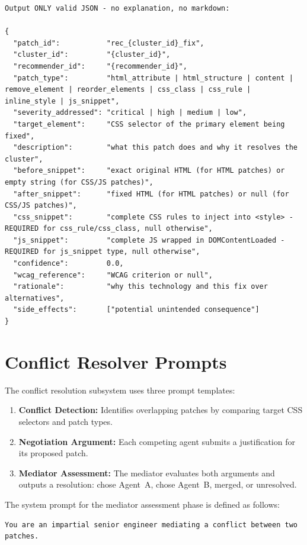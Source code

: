 \begin{itemize}
\begin{lstlisting}[caption={Recommender Patch Synthesis system prompt excerpt (from \filepath{prompts/recommender\_prompts.py}).}, label={lst:recommender-prompt}]
Output ONLY valid JSON - no explanation, no markdown:

{
  "patch_id":           "rec_{cluster_id}_fix",
  "cluster_id":         "{cluster_id}",
  "recommender_id":     "{recommender_id}",
  "patch_type":         "html_attribute | html_structure | content | remove_element | reorder_elements | css_class | css_rule | inline_style | js_snippet",
  "severity_addressed": "critical | high | medium | low",
  "target_element":     "CSS selector of the primary element being fixed",
  "description":        "what this patch does and why it resolves the cluster",
  "before_snippet":     "exact original HTML (for HTML patches) or empty string (for CSS/JS patches)",
  "after_snippet":      "fixed HTML (for HTML patches) or null (for CSS/JS patches)",
  "css_snippet":        "complete CSS rules to inject into <style> - REQUIRED for css_rule/css_class, null otherwise",
  "js_snippet":         "complete JS wrapped in DOMContentLoaded - REQUIRED for js_snippet type, null otherwise",
  "confidence":         0.0,
  "wcag_reference":     "WCAG criterion or null",
  "rationale":          "why this technology and this fix over alternatives",
  "side_effects":       ["potential unintended consequence"]
}
\end{lstlisting}


\section{Conflict Resolver Prompts}
\label{app:resolver-prompts}

The conflict resolution subsystem uses three prompt templates:
\begin{enumerate}
    \item \textbf{Conflict Detection:} Identifies overlapping patches by comparing target CSS selectors and patch types.
    \item \textbf{Negotiation Argument:} Each competing agent submits a justification for its proposed patch.
    \item \textbf{Mediator Assessment:} The mediator evaluates both arguments and outputs a resolution: chose Agent~A, chose Agent~B, merged, or unresolved.
\end{enumerate}

The system prompt for the mediator assessment phase is defined as follows:

\begin{lstlisting}[caption={Conflict Mediator system prompt excerpt (from \filepath{prompts/recommender\_prompts.py}).}, label={lst:mediator-prompt}]
You are an impartial senior engineer mediating a conflict between two patches.


\end{lstlisting}
\end{itemize}
